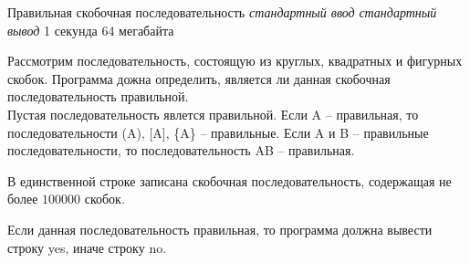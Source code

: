 \begin{problem}%
{Правильная скобочная последовательность}%
{\textsl{стандартный ввод}}%
{\textsl{стандартный вывод}}%
{1 секунда}%
{64 мегабайта}%
{}

Рассмотрим последовательность, состоящую из круглых, квадратных и фигурных скобок. Программа дожна определить, является ли данная скобочная последовательность правильной.\\

Пустая последовательность явлется правильной. Если A – правильная, то последовательности (A), [A], \{A\} – правильные. Если A и B – правильные последовательности, то последовательность AB – правильная.

\InputFile

В единственной строке записана скобочная последовательность, содержащая не более $100000$ скобок.

\OutputFile

Если данная последовательность правильная, то программа должна вывести строку yes, иначе строку no.

\Examples

\begin{example}
%
\end{example}
\end{problem}
